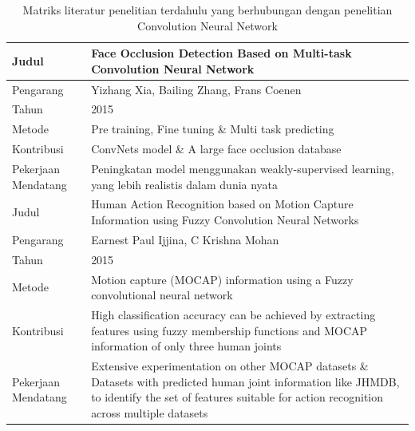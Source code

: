 \begin{table}
	\clearpage
	\centering
	\caption{Matriks literatur penelitian terdahulu yang berhubungan dengan penelitian Convolution Neural Network}
	\label{tab:tab1}
	\begin{tabular}{ |m{2cm}|m{7cm}|m{1cm}|m{1cm}| } 
		\hline
		Judul & \multicolumn{3}{|m{13cm}|}{Face Occlusion Detection Based on Multi-task Convolution Neural Network} \\
		\hline
		Pengarang & \multicolumn{3}{|m{13cm}|}{Yizhang Xia, Bailing Zhang, Frans Coenen} \\ 
		\hline
		Tahun & \multicolumn{3}{|m{13cm}|}{2015} \\ 
		\hline
		Metode & \multicolumn{3}{|m{13cm}|}{Pre training, Fine tuning \& Multi task predicting}\\
		\hline
		Kontribusi  & \multicolumn{3}{|m{13cm}|}{ConvNets model \& A large face occlusion database}\\ 
		\hline
		Pekerjaan Mendatang  & \multicolumn{3}{|m{13cm}|}{Peningkatan model menggunakan weakly-supervised learning, yang lebih realistis dalam dunia nyata} \\		
		\hline\hline
		
		Judul & \multicolumn{3}{|m{13cm}|}{Human Action Recognition based on Motion Capture Information using Fuzzy Convolution Neural Networks} \\
		\hline
		Pengarang & \multicolumn{3}{|m{13cm}|}{Earnest Paul Ijjina, C Krishna Mohan} \\ 
		\hline
		Tahun & \multicolumn{3}{|m{13cm}|}{2015} \\ 
		\hline
		Metode & \multicolumn{3}{|m{13cm}|}{Motion capture (MOCAP) information using a Fuzzy convolutional neural network}\\
		\hline
		Kontribusi  & \multicolumn{3}{|m{13cm}|}{High classification accuracy can be achieved by extracting features using fuzzy membership functions and MOCAP information of only three human joints}\\ 
		\hline
		Pekerjaan Mendatang  & \multicolumn{3}{|m{13cm}|}{Extensive experimentation on other MOCAP datasets \& Datasets with predicted human joint information like JHMDB, to identify the set of features suitable for action recognition across multiple datasets} \\ 
		\hline\hline
		

\end{tabular}
\end{table}
